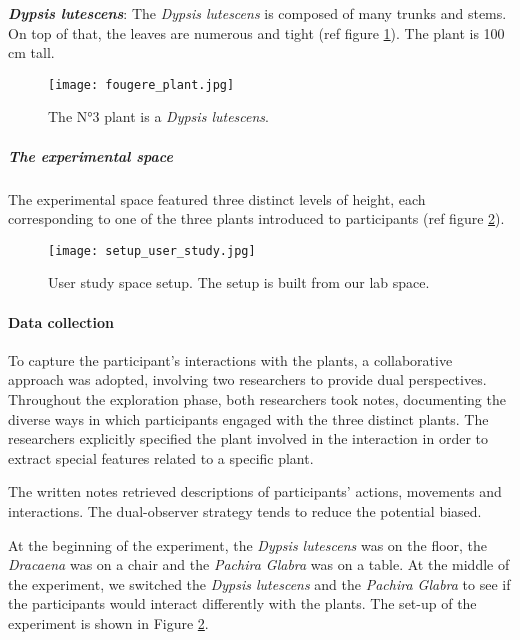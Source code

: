 \textit{\textbf{Dypsis lutescens}}: The \textit{Dypsis lutescens} is composed of many trunks and stems. On top of that, the leaves are numerous and tight (ref figure \ref{fig:fougere_plant}). The plant is 100 cm tall.

\begin{figure}[h!]
    \centering
    \texttt{[image: fougere\_plant.jpg]}
    \caption{The N°3 plant is a \textit{Dypsis lutescens}.}
    
    \vspace{-0.5cm}
    \label{fig:fougere_plant}
    \vspace{0.2cm}
\end{figure}



\subparagraph*{The experimental space}
The experimental space featured three distinct levels of height, each corresponding to one of the three plants introduced to participants (ref figure \ref{fig:setup_user_study}).

\begin{figure}[h]
    \centering
    \texttt{[image: setup\_user\_study.jpg]}
    \caption{User study space setup. The setup is built from our lab space.}
    
    \vspace{-0.5cm}
    \label{fig:setup_user_study}
    \vspace{0.2cm}
\end{figure}

\paragraph{Data collection}
To capture the participant's interactions with the plants, a collaborative approach was adopted, involving two researchers to provide dual perspectives.
Throughout the exploration phase, both researchers took notes, documenting the diverse ways in which participants engaged with the three distinct plants.
The researchers explicitly specified the plant involved in the interaction in order to extract special features related to a specific plant.

The written notes retrieved descriptions of participants' actions, movements and interactions.
The dual-observer strategy tends to reduce the potential biased.

At the beginning of the experiment, the \textit{Dypsis lutescens} was on the floor, the \textit{Dracaena} was on a chair and the \textit{Pachira Glabra} was on a table.
At the middle of the experiment, we switched the \textit{Dypsis lutescens} and the \textit{Pachira Glabra} to see if the participants would interact differently with the plants.
The set-up of the experiment is shown in Figure \ref{fig:setup_user_study}. 


